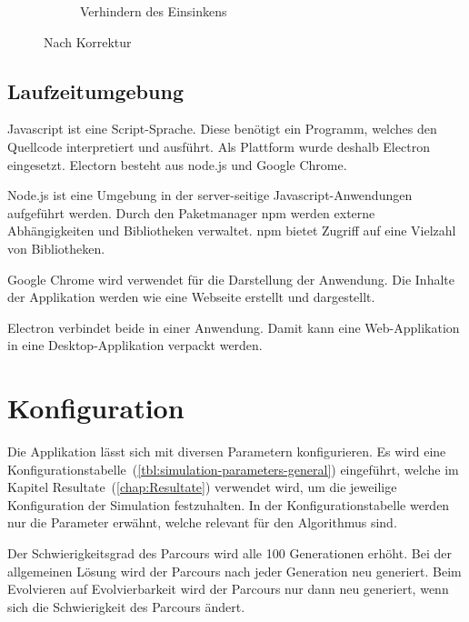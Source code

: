 \begin{figure}[H]
\begin{subfigure}[b]{0.45\textwidth}
          \caption{Verhindern des Einsinkens\label{fig:noNachEinsinken}}
        \end{subfigure}
        \caption{Nach Korrektur}
      \end{figure}

    \subsection{Laufzeitumgebung}

      Javascript ist eine Script-Sprache.
      Diese benötigt ein Programm, welches den Quellcode interpretiert und ausführt.
      Als Plattform wurde deshalb Electron eingesetzt. Electorn besteht aus node.js und Google Chrome.

      \medskip

      Node.js ist eine Umgebung in der server-seitige Javascript-Anwendungen aufgeführt werden.
      Durch den Paketmanager \acrfull{npm} werden externe Abhängigkeiten und Bibliotheken verwaltet.
      \acrshort{npm} bietet Zugriff auf eine Vielzahl von Bibliotheken.

      \medskip

      Google Chrome wird verwendet für die Darstellung der Anwendung.
      Die Inhalte der Applikation werden wie eine Webseite erstellt und dargestellt.

      \medskip

      Electron verbindet beide in einer Anwendung.
      Damit kann eine Web-Applikation in eine Desktop-Applikation verpackt werden.

  \section{Konfiguration\label{sec:Konfiguration}}

    Die Applikation lässt sich mit diversen Parametern konfigurieren.
    Es wird eine Konfigurationstabelle~(\vref{tbl:simulation-parameters-general}) eingeführt,
    welche im Kapitel Resultate~(\vref{chap:Resultate}) verwendet wird,
    um die jeweilige Konfiguration der Simulation festzuhalten.
    In der Konfigurationstabelle werden nur die Parameter erwähnt,
    welche relevant für den Algorithmus sind.

    \medskip

    Der Schwierigkeitsgrad des Parcours wird alle 100 Generationen erhöht.
    Bei der allgemeinen Lösung wird der Parcours nach jeder Generation neu generiert.
    Beim Evolvieren auf Evolvierbarkeit wird der Parcours nur dann neu generiert,
    wenn sich die Schwierigkeit des Parcours ändert.

